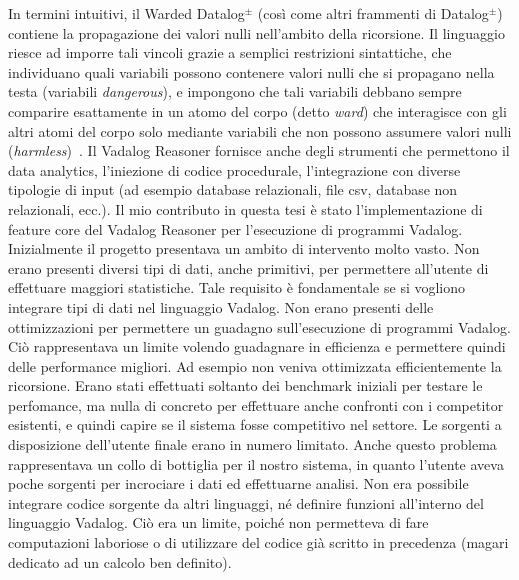 In termini intuitivi, il Warded Datalog$^\pm$ (così come altri frammenti di Datalog$^\pm$) contiene la propagazione dei valori nulli nell'ambito della ricorsione. Il linguaggio riesce ad imporre tali vincoli grazie a semplici restrizioni sintattiche, che individuano quali variabili possono contenere valori nulli che si propagano nella testa (variabili \emph{dangerous}), e impongono che tali variabili debbano sempre comparire esattamente in un atomo del corpo (detto \emph{ward}) che interagisce con gli altri atomi del corpo solo mediante variabili che non possono assumere valori nulli (\emph{harmless})~\cite{bellomarini2017swift}. \newline
Il Vadalog Reasoner fornisce anche degli strumenti che permettono il data analytics, l'iniezione di codice procedurale, l'integrazione con diverse tipologie di input (ad esempio database relazionali, file csv, database non relazionali, ecc.).\newline \newline
Il mio contributo in questa tesi è stato l'implementazione di feature core del Vadalog Reasoner per l'esecuzione di programmi Vadalog. \newline
Inizialmente il progetto presentava un ambito di intervento molto vasto. \newline
Non erano presenti diversi tipi di dati, anche primitivi, per permettere all'utente di effettuare maggiori statistiche. Tale requisito è fondamentale se si vogliono integrare tipi di dati nel linguaggio Vadalog. \newline
Non erano presenti delle ottimizzazioni per permettere un guadagno sull'esecuzione di programmi Vadalog. Ciò rappresentava un limite volendo guadagnare in efficienza e permettere quindi delle performance migliori. Ad esempio non veniva ottimizzata efficientemente la ricorsione. \newline
Erano stati effettuati soltanto dei benchmark iniziali per testare le perfomance, ma nulla di concreto per effettuare anche confronti con i competitor esistenti, e quindi capire se il sistema fosse competitivo nel settore. \newline
Le sorgenti a disposizione dell'utente finale erano in numero limitato. Anche questo problema rappresentava un collo di bottiglia per il nostro sistema, in quanto l'utente aveva poche sorgenti per incrociare i dati ed effettuarne analisi. \newline
Non era possibile integrare codice sorgente da altri linguaggi, né definire funzioni all'interno del linguaggio Vadalog. Ciò era un limite, poiché non permetteva di fare computazioni laboriose o di utilizzare del codice già scritto in precedenza (magari dedicato ad un calcolo ben definito). \newline
